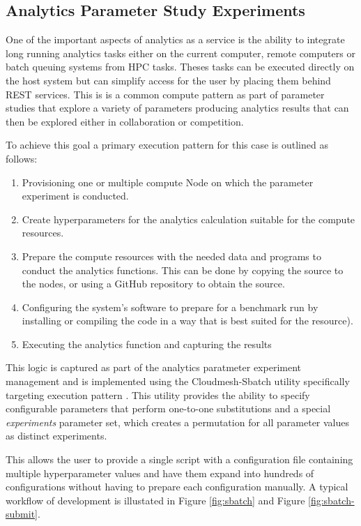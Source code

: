 \subsection{Analytics Parameter Study Experiments}

One of the important aspects of analytics as a service is the ability to integrate long running analytics tasks either 
on the current computer, remote computers or batch queuing systems from HPC tasks. Theses tasks can be 
executed directly on the host system but can simplify access for the user by placing them behind REST 
services. This is is a common compute pattern as part of parameter studies that explore a variety of 
parameters producing analytics results that can then be explored either in collaboration or competition. 

To achieve this goal a primary execution pattern for this case is outlined as follows:


\begin{enumerate}
    \item Provisioning one or multiple compute Node on which the parameter experiment is conducted.
    \item Create hyperparameters for the analytics calculation suitable for the compute resources.
    \item Prepare the compute resources with the needed data and programs to conduct the analytics 
          functions. This can be done by copying the source to the nodes, or using a GitHub repository to 
          obtain the source.
    \item Configuring the system's software to prepare for a benchmark run by installing or compiling the code 
          in a way that is best suited for the resource).
    \item Executing the analytics function and capturing the results
\end{enumerate}

This logic is captured as part of the analytics paratmeter experiment  management and is implemented using the Cloudmesh-Sbatch utility specifically targeting execution pattern \cite{repo-cloudmesh-sbatch}.
This utility provides the ability to specify configurable parameters that perform one-to-one substitutions and a special \textit{experiments} parameter set, which creates a permutation for all parameter values as distinct experiments.

This allows the user to provide a single script with a configuration file containing multiple hyperparameter values and have them expand into hundreds of configurations without having to prepare each configuration manually.
A typical workflow of development is illustated in Figure \ref{fig:sbatch} and Figure \ref{fig:sbatch-submit}.


